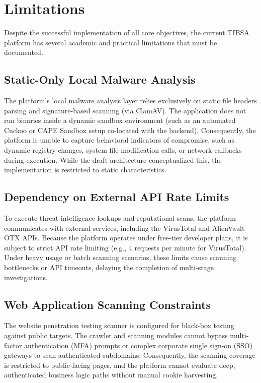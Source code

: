 \section{Limitations}
\label{sec:ch7_limitations}

Despite the successful implementation of all core objectives, the current TIBSA platform has several academic and practical limitations that must be documented.

\subsection{Static-Only Local Malware Analysis}
The platform's local malware analysis layer relies exclusively on static file headers parsing and signature-based scanning (via ClamAV). The application does not run binaries inside a dynamic sandbox environment (such as an automated Cuckoo or CAPE Sandbox setup co-located with the backend). Consequently, the platform is unable to capture behavioral indicators of compromise, such as dynamic registry changes, system file modification calls, or network callbacks during execution. While the draft architecture conceptualized this, the implementation is restricted to static characteristics.

\subsection{Dependency on External API Rate Limits}
To execute threat intelligence lookups and reputational scans, the platform communicates with external services, including the VirusTotal and AlienVault OTX APIs. Because the platform operates under free-tier developer plans, it is subject to strict API rate limiting (e.g., 4 requests per minute for VirusTotal). Under heavy usage or batch scanning scenarios, these limits cause scanning bottlenecks or API timeouts, delaying the completion of multi-stage investigations.

\subsection{Web Application Scanning Constraints}
The website penetration testing scanner is configured for black-box testing against public targets. The crawler and scanning modules cannot bypass multi-factor authentication (MFA) prompts or complex corporate single sign-on (SSO) gateways to scan authenticated subdomains. Consequently, the scanning coverage is restricted to public-facing pages, and the platform cannot evaluate deep, authenticated business logic paths without manual cookie harvesting.

